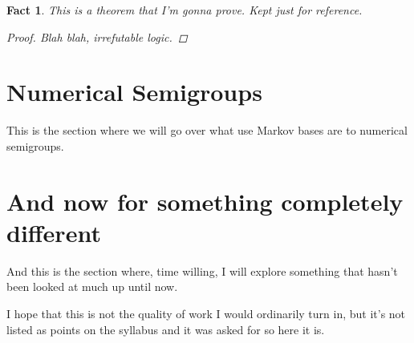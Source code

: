 \documentclass[11pt]{amsart}
\theoremstyle{plain}
\newtheorem{fact}{Fact}
\theoremstyle{definition}
\begin{document}
\begin{fact}
This is a theorem that I'm gonna prove. Kept just for reference.

\begin{proof}
Blah blah, irrefutable logic.
\end{proof}
\end{fact}

\section{Numerical Semigroups}
This is the section where we will go over what use Markov bases are to numerical semigroups.
\section{And now for something completely different}
And this is the section where, time willing, I will explore something that hasn't been looked at much up until now.

I hope that this is not the quality of work I would ordinarily turn in, but it's not listed as points on the syllabus and it was asked for so here it is.
\nocite{*}


\end{document}
